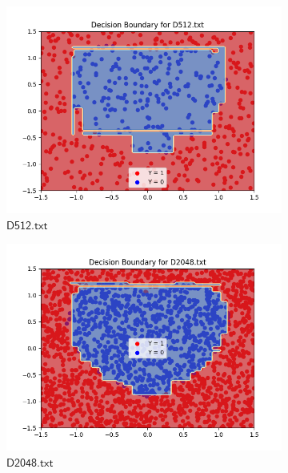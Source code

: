 \documentclass[a4paper]{article}
\theoremstyle{definition}
\newenvironment{soln}{
    \leavevmode\color{blue}\ignorespaces
}{}
\begin{document}
\begin{enumerate}
\begin{soln}
\begin{figure}[h]
\begin{subfigure}{0.5\textwidth}
          \centering
          \includegraphics[width=1.1\linewidth]{Decision_Boundary_D512.png}
          \caption{$\mathsf{D512.txt}$}
          \label{fig:7sub3}
        \end{subfigure}%
        \begin{subfigure}{0.5\textwidth}
          \centering
          \includegraphics[width=1.1\linewidth]{Decision_Boundary_D2048.png}
          \caption{$\mathsf{D2048.txt}$}
          \label{fig:7sub4}
          \end{subfigure}
          \centering
          \begin{subfigure}{0.5\textwidth}
          \centering

\end{subfigure}
\end{figure}
\end{soln}
\end{enumerate}
\end{document}
